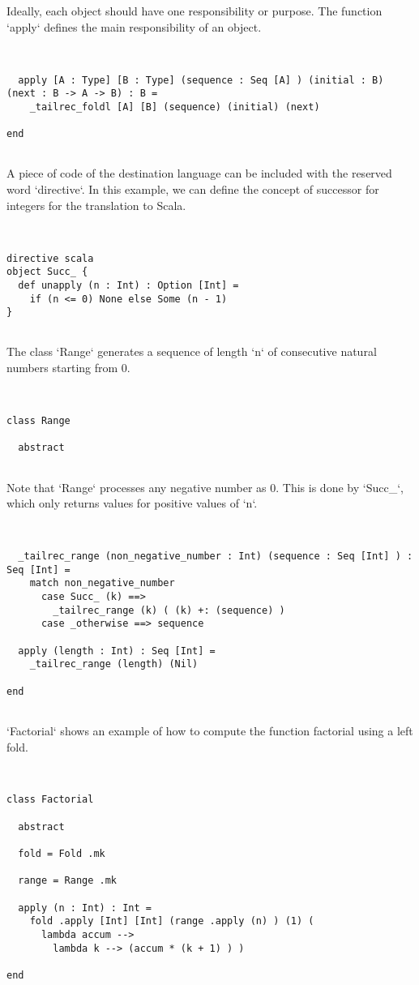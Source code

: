 \documentclass[12pt,a4paper]{article}
\begin{document}
Ideally, each object should have one responsibility or purpose. The function `apply`
defines the main responsibility of an object.


\begin{lstlisting}


  apply [A : Type] [B : Type] (sequence : Seq [A] ) (initial : B) (next : B -> A -> B) : B =
    _tailrec_foldl [A] [B] (sequence) (initial) (next)

end


\end{lstlisting}

A piece of code of the destination language can be included with the reserved word
`directive`. In this example, we can define the concept of successor for integers for the
translation to Scala.


\begin{lstlisting}


directive scala
object Succ_ {
  def unapply (n : Int) : Option [Int] =
    if (n <= 0) None else Some (n - 1)
}


\end{lstlisting}

The class `Range` generates a sequence of length `n` of consecutive natural numbers starting
from 0.


\begin{lstlisting}


class Range

  abstract


\end{lstlisting}

Note that `Range` processes any negative number as 0. This is done by `Succ_`, which only
returns values for positive values of `n`.


\begin{lstlisting}


  _tailrec_range (non_negative_number : Int) (sequence : Seq [Int] ) : Seq [Int] =
    match non_negative_number
      case Succ_ (k) ==>
        _tailrec_range (k) ( (k) +: (sequence) )
      case _otherwise ==> sequence

  apply (length : Int) : Seq [Int] =
    _tailrec_range (length) (Nil)

end


\end{lstlisting}

`Factorial` shows an example of how to compute the function factorial using a left fold.


\begin{lstlisting}


class Factorial

  abstract

  fold = Fold .mk

  range = Range .mk

  apply (n : Int) : Int =
    fold .apply [Int] [Int] (range .apply (n) ) (1) (
      lambda accum -->
        lambda k --> (accum * (k + 1) ) )

end


\end{lstlisting}
\end{document}
